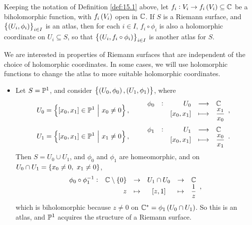 \begin{remark}
Keeping the notation of Definition \ref{def:15.1} above, let $ f_i : V_i \to f_i\br{V_i} \subseteq \CC $ be a biholomorphic function, with $ f_i\br{V_i} $ open in $ \mathbb{C} $. If $ S $ is a Riemann surface, and $ \cbr{\br{U_i, \phi_i}}_{i \in I} $ is an atlas, then for each $ i \in I $, $ f_i \circ \phi_i $ is also a holomorphic coordinate on $ U_i \subseteq S $, so that $ \cbr{\br{U_i, f_i \circ \phi_i}}_{i \in I} $ is another atlas for $ S $.
\end{remark}

We are interested in properties of Riemann surfaces that are independent of the choice of holomorphic coordinates. In some cases, we will use holomorphic functions to change the atlas to more suitable holomorphic coordinates.

\begin{example}
\hfill
\begin{itemize}
\item Let $ S = \mathbb{P}^1 $, and consider $ \cbr{\br{U_0, \phi_0}, \br{U_1, \phi_1}} $, where
$$ U_0 = \cbr{\sbr{x_0, x_1} \in \PP^1 \st x_0 \ne 0}, \qquad \function[\phi_0]{U_0}{\CC}{\sbr{x_0, x_1}}{\dfrac{x_1}{x_0}}, $$
$$ U_1 = \cbr{\sbr{x_0, x_1} \in \PP^1 \st x_1 \ne 0}, \qquad \function[\phi_1]{U_1}{\CC}{\sbr{x_0, x_1}}{\dfrac{x_0}{x_1}}. $$
Then $ S = U_0 \cup U_1 $, and $ \phi_0 $ and $ \phi_1 $ are homeomorphic, and on $ U_0 \cap U_1 = \cbr{x_0 \ne 0, \ x_1 \ne 0} $,
$$
\begin{array}{crcccl}
\phi_0 \circ \phi_1^{-1} : & \CC \setminus \cbr{0} & \to & U_1 \cap U_0 & \to & \CC \\
& z & \mapsto & \sbr{z, 1} & \mapsto & \dfrac{1}{z}
\end{array},
$$
which is biholomorphic because $ z \ne 0 $ on $ \CC^* = \phi_1\br{U_0 \cap U_1} $. So this is an atlas, and $ \mathbb{P}^1 $ acquires the structure of a Riemann surface.

\pagebreak



\end{itemize}
\end{example}
